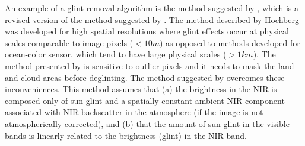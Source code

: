 An example of a glint removal algorithm is the method suggested by \cite{Hedley:2005}, which is a revised version of the method suggested by \cite{Hochberg:2003}. The method described by Hochberg was developed for high spatial resolutions where glint effects occur at physical scales comparable to image pixels ($<10m$) as opposed to methods developed for ocean-color sensor, which tend to have large physical scales ($>1km$).
The method presented by \cite{Hochberg:2003} is sensitive to outlier pixels and it needs to mask the land and cloud areas before deglinting. The method suggested by \cite{Hedley:2005} overcomes these inconveniences. This method assumes that (a) the brightness in the NIR is composed only of sun glint and a spatially constant ambient NIR component associated with NIR backscatter in the atmosphere (if the image is not atmospherically corrected), and (b) that the amount of sun glint in the visible bands is linearly related to the brightness (glint) in the NIR band. 

